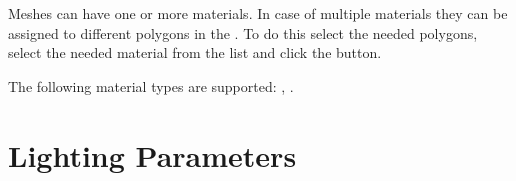 \documentclass[a4paper,12pt,oneside]{sphinxmanual}
\begin{document}
Meshes can have one or more materials. In case of multiple materials they can be assigned to different polygons in the . To do this select the needed polygons, select the needed material from the list and click the  button.

The following material types are supported: , .


\section{Lighting Parameters}
\label{materials:id2}\label{materials:index-1}\label{materials:material-lighting-params}\begin{figure}[htbp]
\centering

\end{figure}
\end{document}
